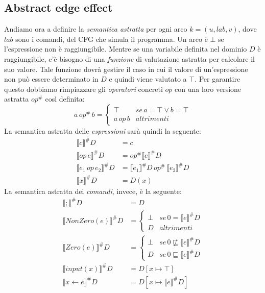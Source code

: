 \documentclass[a4paper,oneside,titlepage]{book}
\begin{document}
\subsection{Abstract edge effect}
\label{const2}
Andiamo ora a definire la \textit{semantica astratta} per ogni arco $k=(u,lab,v)$, dove $lab$ sono i comandi, del CFG che simula il programma. Un arco è $\bot$ se l'espressione non è raggiungibile. Mentre se una variabile definita nel dominio $D$ è raggiungibile, c'è bisogno di una \textit{funzione} di valutazione astratta per calcolare il suo valore. Tale funzione dovrà gestire il caso in cui il valore di un'espressione non può essere determinato in $D$ e quindi viene valutato a $\top$. Per garantire questo dobbiamo rimpiazzare gli \textit{operatori} concreti $op$ con una loro versione astratta $op^\#$ così definita:
\[
a \, op^\# \, b =
\begin{cases}
	\top & se \, a=\top \vee b=\top \\
	a \, op \, b & altrimenti
\end{cases}
\]
La semantica astratta delle \textit{espressioni} sarà quindi la seguente:
\begin{align*}
	\llbracket c \rrbracket^\# D &= c \\
	\llbracket op \, e \rrbracket^\# D &= op^\# \llbracket e \rrbracket^\# D \\
	\llbracket e_1 \, op \, e_2 \rrbracket^\# D &= \llbracket e_1 \rrbracket^\# D \, op^\# \, \llbracket e_2 \rrbracket^\# D \\
	\llbracket x \rrbracket^\# D &= D(x)
\end{align*}
La semantica astratta dei \textit{comandi}, invece, è la seguente:
\begin{align*}
	\llbracket ; \rrbracket^\# D &= D \\
	\llbracket NonZero(e) \rrbracket^\# D &=
	\begin{cases}
		\bot & se \, 0 = \llbracket e \rrbracket^\# D \\
		D & altrimenti
	\end{cases} \\
	\llbracket Zero(e) \rrbracket^\# D &=
	\begin{cases}
	    \bot & se \, 0 \not\sqsubseteq \llbracket e \rrbracket^\# D \\
		D & se \, 0 \sqsubseteq \llbracket e \rrbracket^\# D
	\end{cases} \\
	\llbracket input(x) \rrbracket^\# D &= D[x \mapsto \top] \\
	\llbracket x \leftarrow e \rrbracket^\# D &= D[x \mapsto \llbracket e \rrbracket^\# D]
\end{align*}
\end{document}
